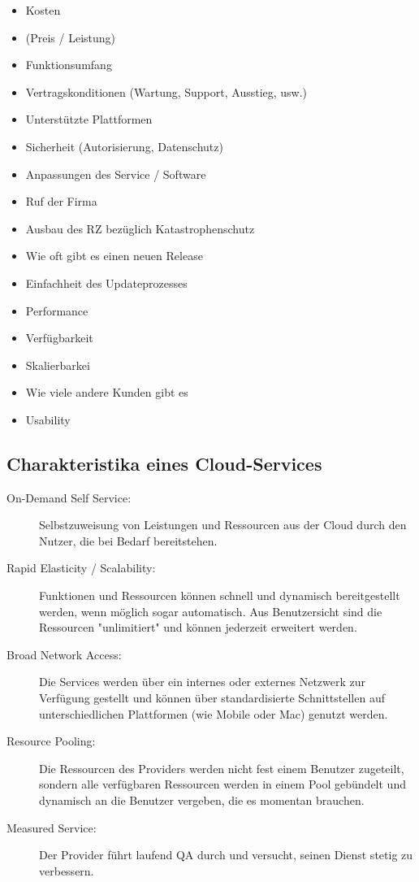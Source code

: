 \documentclass[a4paper, 11pt]{article}
\begin{document}
\begin{multicols}{2}
	\begin{itemize}
		\item Kosten
		\item(Preis / Leistung)
		\item Funktionsumfang
		\item Vertragskonditionen (Wartung, Support, Ausstieg, usw.)
		\item Unterstützte Plattformen
		\item Sicherheit (Autorisierung, Datenschutz)
		\item Anpassungen des Service / Software
		\item Ruf der Firma
		\item Ausbau des RZ bezüglich Katastrophenschutz
		\item Wie oft gibt es einen neuen Release
		\item Einfachheit des Updateprozesses
		\item Performance
		\item Verfügbarkeit
		\item Skalierbarkei
		\item Wie viele andere Kunden gibt es
		\item Usability
	\end{itemize}
\end{multicols}

\subsection{Charakteristika eines Cloud-Services}

\begin{description}
	\item[On-Demand Self Service: ] Selbstzuweisung von Leistungen und Ressourcen aus der Cloud durch den Nutzer, die bei Bedarf bereitstehen.
	\item[Rapid Elasticity / Scalability: ] Funktionen und Ressourcen können schnell und dynamisch bereitgestellt werden, wenn möglich sogar automatisch. Aus Benutzersicht sind die Ressourcen "unlimitiert" und können jederzeit erweitert werden.
	\item[Broad Network Access: ] Die Services werden über ein internes oder externes Netzwerk zur Verfügung gestellt und können über standardisierte Schnittstellen auf unterschiedlichen Plattformen (wie Mobile oder Mac) genutzt werden.
	\item[Resource Pooling: ] Die Ressourcen des Providers werden nicht fest einem Benutzer zugeteilt, sondern alle verfügbaren Ressourcen werden in einem Pool gebündelt und dynamisch an die Benutzer vergeben, die es momentan brauchen.
	\item[Measured Service: ] Der Provider führt laufend QA	durch und versucht, seinen Dienst stetig zu verbessern.
\end{description}
\end{document}
